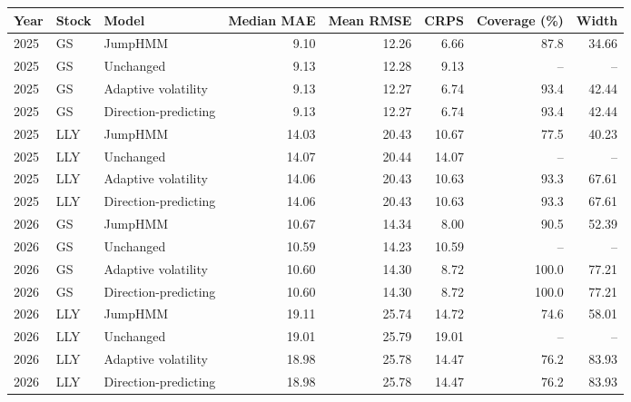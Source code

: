 \begin{tabular}{lllrrrrr}
\toprule
Year & Stock & Model & Median MAE & Mean RMSE & CRPS & Coverage (\%) & Width \\
\midrule
2025 & GS & JumpHMM & 9.10 & 12.26 & 6.66 & 87.8 & 34.66 \\
2025 & GS & Unchanged & 9.13 & 12.28 & 9.13 & -- & -- \\
2025 & GS & Adaptive volatility & 9.13 & 12.27 & 6.74 & 93.4 & 42.44 \\
2025 & GS & Direction-predicting & 9.13 & 12.27 & 6.74 & 93.4 & 42.44 \\
2025 & LLY & JumpHMM & 14.03 & 20.43 & 10.67 & 77.5 & 40.23 \\
2025 & LLY & Unchanged & 14.07 & 20.44 & 14.07 & -- & -- \\
2025 & LLY & Adaptive volatility & 14.06 & 20.43 & 10.63 & 93.3 & 67.61 \\
2025 & LLY & Direction-predicting & 14.06 & 20.43 & 10.63 & 93.3 & 67.61 \\
2026 & GS & JumpHMM & 10.67 & 14.34 & 8.00 & 90.5 & 52.39 \\
2026 & GS & Unchanged & 10.59 & 14.23 & 10.59 & -- & -- \\
2026 & GS & Adaptive volatility & 10.60 & 14.30 & 8.72 & 100.0 & 77.21 \\
2026 & GS & Direction-predicting & 10.60 & 14.30 & 8.72 & 100.0 & 77.21 \\
2026 & LLY & JumpHMM & 19.11 & 25.74 & 14.72 & 74.6 & 58.01 \\
2026 & LLY & Unchanged & 19.01 & 25.79 & 19.01 & -- & -- \\
2026 & LLY & Adaptive volatility & 18.98 & 25.78 & 14.47 & 76.2 & 83.93 \\
2026 & LLY & Direction-predicting & 18.98 & 25.78 & 14.47 & 76.2 & 83.93 \\
\bottomrule
\end{tabular}

